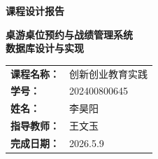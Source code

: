 \thispagestyle{empty}

\vspace*{2cm}

\begin{center}
  \Large\bfseries

  \vspace{1cm}

  \textbf{课程设计报告}

  \vspace{2cm}

  \Huge\bfseries
  桌游桌位预约与战绩管理系统 \\
  数据库设计与实现

  \vspace{3cm}

  \Large

  \begin{tabular}{ll}
    \textbf{课程名称：} & 创新创业教育实践 \\[0.5cm]
    \textbf{学号：} & 202400800645 \\[0.5cm]
    \textbf{姓名：} & 李昊阳  \\[0.5cm]
    \textbf{指导教师：} &  王文玉  \\[0.5cm]
    \textbf{完成日期：} & 2026.5.9  \\[0.5cm]
  \end{tabular}

  \vspace{3cm}

  \normalsize

  

\end{center}

\vfill

\newpage
